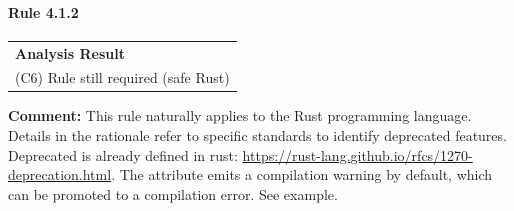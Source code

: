 \paragraph{Rule 4.1.2}
\begin{longtable}{p{13cm}}
\textbf{Analysis Result} \\
(C6) Rule still required (safe Rust) \\
\end{longtable}
\textbf{Comment:} This rule naturally applies to the Rust programming language. Details in the rationale refer to specific \Cpp standards to identify deprecated features. Deprecated is already defined in rust: \url{https://rust-lang.github.io/rfcs/1270-deprecation.html}. The attribute emits a compilation warning by default, which can be promoted to a compilation error. See example. \\



